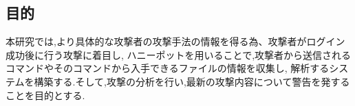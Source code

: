 \documentclass{entry}
\begin{document}
\subsection{目的}
本研究では,より具体的な攻撃者の攻撃手法の情報を得る為、攻撃者がログイン成功後に行う攻撃に着目し,
ハニーポットを用いることで,攻撃者から送信されるコマンドやそのコマンドから入手できるファイルの情報を収集し,
解析するシステムを構築する.そして,攻撃の分析を行い,最新の攻撃内容について警告を発することを目的とする.
\end{document}
